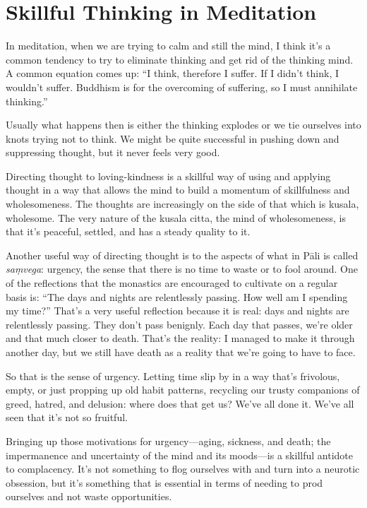 \chapter{Skillful Thinking in
Meditation}

In meditation, when we are trying to calm and still the mind, I think
it’s a common tendency to try to eliminate thinking and get rid of the
thinking mind. A common equation comes up: “I think, therefore I suffer.
If I didn’t think, I wouldn’t suffer. Buddhism is for the overcoming of
suffering, so I must annihilate thinking.”

Usually what happens then is either the thinking explodes or we tie
ourselves into knots trying not to think. We might be quite successful
in pushing down and suppressing thought, but it never feels very good.

Directing thought to loving-kindness is a skillful way of using and
applying thought in a way that allows the mind to build a momentum of
skillfulness and wholesomeness. The thoughts are increasingly on the
side of that which is kusala, wholesome. The very nature of the kusala
citta, the mind of wholesomeness, is that it’s peaceful, settled, and
has a steady quality to it.

Another useful way of directing thought is to the aspects of what in
Pāli is called \emph{saṃvega}: urgency, the sense that there is no time
to waste or to fool around. One of the reflections that the monastics
are encouraged to cultivate on a regular basis is: “The days and nights
are relentlessly passing. How well am I spending my time?” That’s a very
useful reflection because it is real: days and nights are relentlessly
passing. They don’t pass benignly. Each day that passes, we’re older and
that much closer to death. That’s the reality: I managed to make it
through another day, but we still have death as a reality that we’re
going to have to face.

So that is the sense of urgency. Letting time slip by in a way that’s
frivolous, empty, or just propping up old habit patterns, recycling our
trusty companions of greed, hatred, and delusion: where does that get
us? We’ve all done it. We’ve all seen that it’s not so fruitful.

Bringing up those motivations for urgency—aging, sickness, and death;
the impermanence and uncertainty of the mind and its moods—is a skillful
antidote to complacency. It’s not something to flog ourselves with and
turn into a neurotic obsession, but it’s something that is essential in
terms of needing to prod ourselves and not waste opportunities.

